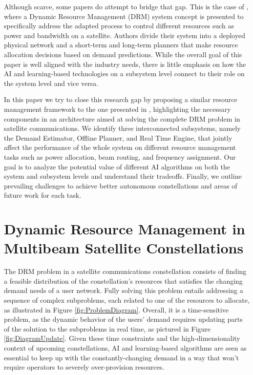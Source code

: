 \documentclass[letterpaper]{article} %
\begin{document}
Although scarce, some papers do attempt to bridge that gap. This is the case of \cite{Guerster2019}, where a Dynamic Resource Management (DRM) system concept is presented to specifically address the adapted process to control different resources such as power and bandwidth on a satellite. Authors divide their system into a deployed physical network and a short-term and long-term planners that make resource allocation decisions based on demand predictions. While the overall goal of this paper is well aligned with the industry needs, there is little emphasis on how the AI and learning-based technologies on a subsystem level connect to their role on the system level and vice versa.

In this paper we try to close this research gap by proposing a similar resource management framework to the one presented in \cite{Guerster2019}, highlighting the necessary components in an architecture aimed at solving the complete DRM problem in satellite communications. We identify three interconnected subsystems, namely the Demand Estimator, Offline Planner, and Real Time Engine, that jointly affect the performance of the whole system on different resource management tasks such as power allocation, beam routing, and frequency assignment. Our goal is to analyze the potential value of different AI algorithms on both the system and subsystem levels and understand their tradeoffs. Finally, we outline prevailing challenges to achieve better autonomous constellations and areas of future work for each task.






\section{Dynamic Resource Management in Multibeam Satellite Constellations}
\label{sec:2}


The DRM problem in a satellite communications constellation consists of finding a feasible distribution of the constellation's resources that satisfies the changing demand needs of a user network. Fully solving this problem entails addressing a sequence of complex subproblems, each related to one of the resources to allocate, as illustrated in Figure \ref{fig:ProblemDiagram}. Overall, it is a time-sensitive problem, as the dynamic behavior of the users' demand requires updating parts of the solution to the subproblems in real time, as pictured in Figure \ref{fig:DiagramUpdate}. Given these time constraints and the high-dimensionality context of upcoming constellations, AI and learning-based algorithms are seen as essential to keep up with the constantly-changing demand in a way that won't require operators to severely over-provision resources. 
\end{document}
